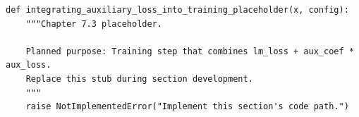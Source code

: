 \begin{lstlisting}[style=bookpython,caption={Planned code placeholder for integrating auxiliary loss into training.},label={lst:ch07-integrating-auxiliary-loss-into-training}]
def integrating_auxiliary_loss_into_training_placeholder(x, config):
    """Chapter 7.3 placeholder.

    Planned purpose: Training step that combines lm_loss + aux_coef * aux_loss.
    Replace this stub during section development.
    """
    raise NotImplementedError("Implement this section's code path.")
\end{lstlisting}
